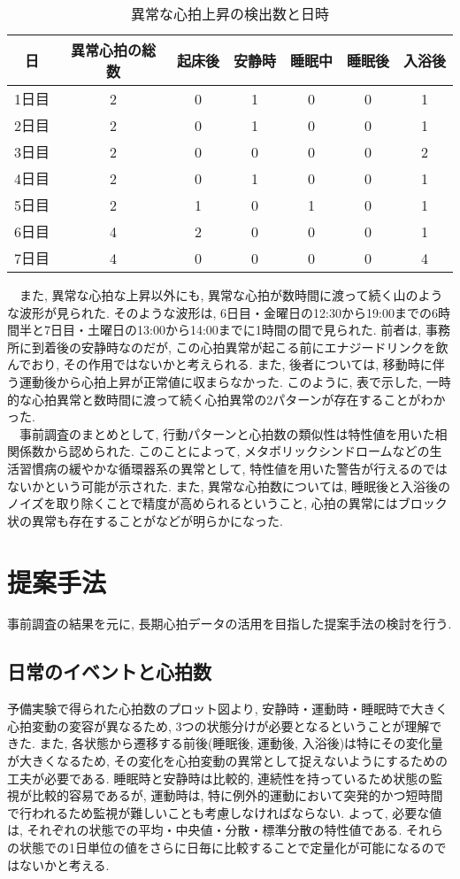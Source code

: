 \documentclass[report, 11pt, a4paper]{jsbook}
\begin{document}
\begin{table}[H]
\centering
\caption{異常な心拍上昇の検出数と日時}
\begin{tabular}{ccccccc}
\hline
日  & 異常心拍の総数 & 起床後 & 安静時 & 睡眠中 & 睡眠後 & 入浴後 \\ \hline
1日目 & 2       & 0   & 1   & 0   & 0   & 1   \\
2日目 & 2       & 0   & 1   & 0   & 0   & 1   \\
3日目 & 2       & 0   & 0   & 0   & 0   & 2   \\
4日目 & 2       & 0   & 1   & 0   & 0   & 1   \\
5日目 & 2       & 1   & 0   & 1   & 0   & 1   \\
6日目 & 4       & 2   & 0   & 0   & 0   & 1   \\
7日目 & 4       & 0   & 0   & 0   & 0   & 4   \\ \hline
\end{tabular}
\end{table}

　また, 異常な心拍な上昇以外にも, 異常な心拍が数時間に渡って続く山のような波形が見られた. そのような波形は, 6日目・金曜日の12:30から19:00までの6時間半と7日目・土曜日の13:00から14:00までに1時間の間で見られた. 前者は, 事務所に到着後の安静時なのだが, この心拍異常が起こる前にエナジードリンクを飲んでおり, その作用ではないかと考えられる. また, 後者については, 移動時に伴う運動後から心拍上昇が正常値に収まらなかった. このように, 表で示した, 一時的な心拍異常と数時間に渡って続く心拍異常の2パターンが存在することがわかった.\\

　事前調査のまとめとして, 行動パターンと心拍数の類似性は特性値を用いた相関係数から認められた. このことによって, メタボリックシンドロームなどの生活習慣病の緩やかな循環器系の異常として, 特性値を用いた警告が行えるのではないかという可能が示された. また, 異常な心拍数については, 睡眠後と入浴後のノイズを取り除くことで精度が高められるということ, 心拍の異常にはブロック状の異常も存在することがなどが明らかになった.
　

\chapter{提案手法}
事前調査の結果を元に, 長期心拍データの活用を目指した提案手法の検討を行う. 

\section{日常のイベントと心拍数}
予備実験で得られた心拍数のプロット図より, 安静時・運動時・睡眠時で大きく心拍変動の変容が異なるため, 3つの状態分けが必要となるということが理解できた. また, 各状態から遷移する前後(睡眠後, 運動後, 入浴後)は特にその変化量が大きくなるため, その変化を心拍変動の異常として捉えないようにするための工夫が必要である. 睡眠時と安静時は比較的, 連続性を持っているため状態の監視が比較的容易であるが, 運動時は, 特に例外的運動において突発的かつ短時間で行われるため監視が難しいことも考慮しなければならない. よって, 必要な値は, それぞれの状態での平均・中央値・分散・標準分散の特性値である. それらの状態での1日単位の値をさらに日毎に比較することで定量化が可能になるのではないかと考える.  
\end{document}
